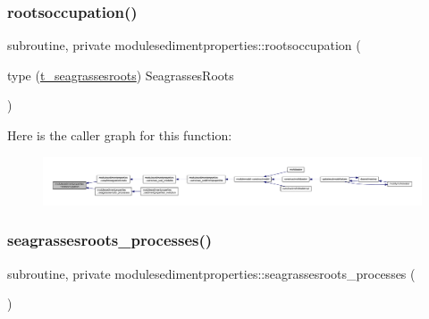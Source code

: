 \subsubsection{\texorpdfstring{rootsoccupation()}{rootsoccupation()}}
{\footnotesize\ttfamily subroutine, private modulesedimentproperties\+::rootsoccupation (\begin{DoxyParamCaption}\item[{type (\mbox{\hyperlink{structmodulesedimentproperties_1_1t__seagrassesroots}{t\+\_\+seagrassesroots}})}]{Seagrasses\+Roots }\end{DoxyParamCaption})\hspace{0.3cm}{\ttfamily [private]}}

Here is the caller graph for this function\+:\nopagebreak
\begin{figure}[H]
\begin{center}
\leavevmode
\includegraphics[width=350pt]{namespacemodulesedimentproperties_ac9dd7bcf2f966e31f868dc3dc7a2cc13_icgraph}
\end{center}
\end{figure}
\mbox{\label{namespacemodulesedimentproperties_abe11ce25dab5cf7abc26eeb1fb7fdcd9}} 
\subsubsection{\texorpdfstring{seagrassesroots\+\_\+processes()}{seagrassesroots\_processes()}}
{\footnotesize\ttfamily subroutine, private modulesedimentproperties\+::seagrassesroots\+\_\+processes (\begin{DoxyParamCaption}{ }\end{DoxyParamCaption})\hspace{0.3cm}{\ttfamily [private]}}

